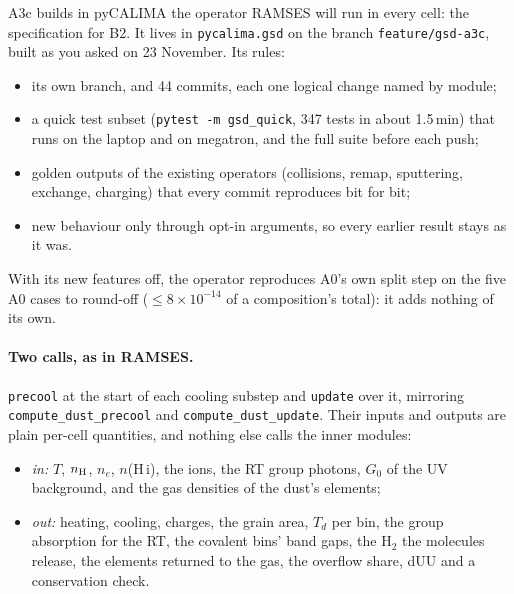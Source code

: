 \documentclass[11pt,a4paper]{article}
\begin{document}
A3c builds in pyCALIMA the operator RAMSES will run in every cell: the specification for B2. It lives in
\texttt{pycalima.gsd} on the branch \texttt{feature/gsd-a3c}, built as you asked on 23 November. Its rules:
\begin{itemize}
\item its own branch, and 44 commits, each one logical change named by module;
\item a quick test subset (\texttt{pytest -m gsd\_quick}, 347 tests in about 1.5\,min) that runs on the laptop and on
  megatron, and the full suite before each push;
\item golden outputs of the existing operators (collisions, remap, sputtering, exchange, charging) that every commit
  reproduces bit for bit;
\item new behaviour only through opt-in arguments, so every earlier result stays as it was.
\end{itemize}
With its new features off, the operator reproduces A0's own split step on the five A0 cases to round-off
($\le8\times10^{-14}$ of a composition's total): it adds nothing of its own.

\paragraph{Two calls, as in RAMSES.} \texttt{precool} at the start of each cooling substep and \texttt{update} over it,
mirroring \texttt{compute\_dust\_precool} and \texttt{compute\_dust\_update}. Their inputs and outputs are plain
per-cell quantities, and nothing else calls the inner modules:
\begin{itemize}
\item \emph{in:} $T$, $n_{\rm H}$, $n_e$, $n$(H\,{\sc i}), the ions, the RT group photons, $G_0$ of the UV background,
  and the gas densities of the dust's elements;
\item \emph{out:} heating, cooling, charges, the grain area, $T_d$ per bin, the group absorption for the RT, the
  covalent bins' band gaps, the H$_2$ the molecules release, the elements returned to the gas, the overflow share,
  dUU and a conservation check.
\end{itemize}
\end{document}
